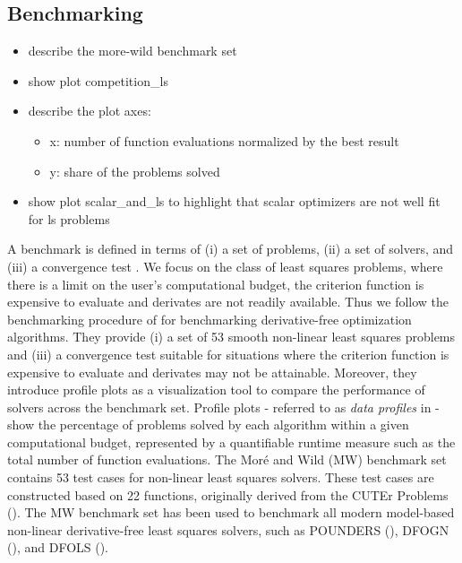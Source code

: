 \subsection{Benchmarking}
\label{subsec:benchmark-core-algo}
\begin{itemize}
    \item describe the more-wild benchmark set
    \item show plot competition\_ls
    \item describe the plot axes:
    \begin{itemize}
            \item x: number of function evaluations normalized by the best result
            \item y: share of the problems solved
        \end{itemize}
        \item show plot scalar\_and\_ls to highlight that scalar optimizers are not well fit for ls problems
    \end{itemize}



\noindent A benchmark is defined in terms of (i) a set of problems, (ii) a set of solvers, and
(iii) a convergence test \cite{Dolan2002}. We focus on the class of least squares problems, where there is a limit on the user's computational budget, the criterion function is expensive to evaluate and derivates are not readily available.
Thus we follow the benchmarking procedure of \cite{MoreWild2009} for benchmarking derivative-free optimization algorithms. They provide (i) a set of 53 smooth non-linear least squares problems and (iii) a convergence test suitable for situations where the criterion function is expensive to evaluate and derivates may not be attainable.
Moreover, they introduce profile plots as a visualization tool to compare the performance of solvers across the benchmark set.
Profile plots - referred to as \textit{data profiles} in \cite{MoreWild2009} - show the percentage of problems solved by each algorithm within a given computational budget, represented by a quantifiable runtime measure such as the total number of function evaluations.
The Moré and Wild (MW) benchmark set contains 53 test cases for non-linear least squares solvers.
These test cases are constructed based on 22 functions, originally derived from the CUTEr
Problems (\cite{Gould2003}). The MW benchmark set has been used to benchmark all modern model-based non-linear derivative-free least squares solvers, such as POUNDERS (\cite{Wild2015}), DFOGN (\cite{Cartis2017}), and DFOLS (\cite{Cartis2019}).


